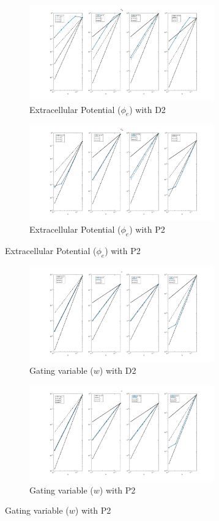 \documentclass[a4paper,11pt]{article}
\begin{document}
\begin{figure}[h]
\begin{subfigure}{0.5\textwidth}
\includegraphics[width = 8cm]{./D2_Phie_1.jpg}
\caption*{Extracellular Potential ($\phi_e$) with D2}
\label{Phie_D2}
\end{subfigure}
\begin{subfigure}{0.5\textwidth}
\includegraphics[width =8cm]{./P2_Phie_1.jpg}
\caption*{Extracellular Potential ($\phi_e$) with P2}
\label{Phie_P2}
\end{subfigure}
\end{figure}
\begin{figure}[h]
\begin{subfigure}{0.5\textwidth}
\includegraphics[width = 8cm]{./D2_w_1.jpg}
\caption*{Gating variable ($w$) with D2}
\label{w_D2}
\end{subfigure}
\begin{subfigure}{0.5\textwidth}
\includegraphics[width =8cm]{./P2_w_1.jpg}
\caption*{Gating variable ($w$) with P2}
\label{w_P2}
\end{subfigure}
\end{figure}
\end{document}
